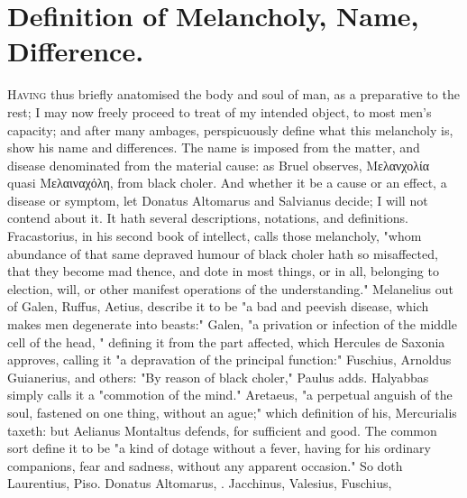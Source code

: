 \section{Definition of Melancholy, Name, Difference.}\label{sec:definition}
\lettrine{H}{aving} thus briefly anatomised the body and soul of man, as a
preparative to the rest; I may now freely proceed to treat of my intended
object, to most men's capacity; and after many ambages, perspicuously define
what this melancholy is, show his name and differences. The name is imposed
from the matter, and disease denominated from the material cause: as Bruel
observes, \textgreek{Μελανχολία} quasi \textgreek{Μελαιναχόλη}, from black
choler. And whether it be a cause or an effect, a disease or symptom, let
Donatus Altomarus and Salvianus decide; I will not contend about it. It hath
several descriptions, notations, and definitions.
Fracastorius, in his second book of intellect, calls those
melancholy, "whom abundance of that same depraved humour of black choler hath
so misaffected, that they become mad thence, and dote in most things, or in
all, belonging to election, will, or other manifest operations of the
understanding." Melanelius out of Galen, Ruffus, Aetius,
describe it to be "a bad and peevish disease, which makes men degenerate into
beasts:" Galen, "a privation or infection of the middle cell of the head,
\etc{}" defining it from the part affected, which Hercules
de Saxonia approves,  calling it "a
depravation of the principal function:" Fuschius,  Arnoldus 
Guianerius, and others: "By reason of black choler," Paulus adds. Halyabbas
simply calls it a "commotion of the mind." Aretaeus, "a
perpetual anguish of the soul, fastened on one thing, without an ague;" which
definition of his, Mercurialis  taxeth: but Aelianus Montaltus defends,  for sufficient and good. The common sort define it to
be "a kind of dotage without a fever, having for his ordinary companions, fear
and sadness, without any apparent occasion." So doth Laurentius,
 Piso. 
Donatus Altomarus, . Jacchinus,
Valesius,  Fuschius,
